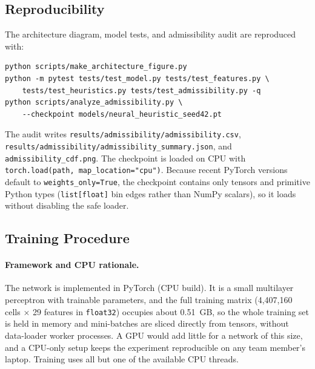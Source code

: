 \documentclass[11pt]{article}
\begin{document}
\subsection{Reproducibility}
The architecture diagram, model tests, and admissibility audit are reproduced
with:
\begin{verbatim}
python scripts/make_architecture_figure.py
python -m pytest tests/test_model.py tests/test_features.py \
    tests/test_heuristics.py tests/test_admissibility.py -q
python scripts/analyze_admissibility.py \
    --checkpoint models/neural_heuristic_seed42.pt
\end{verbatim}
The audit writes \texttt{results/admissibility/admissibility.csv},
\texttt{results/admissibility/admissibility\_summary.json}, and
\texttt{admissibility\_cdf.png}. The checkpoint is loaded on CPU with
\texttt{torch.load(path, map\_location="cpu")}. Because recent PyTorch versions
default to \texttt{weights\_only=True}, the checkpoint contains only tensors and
primitive Python types (\texttt{list[float]} bin edges rather than NumPy
scalars), so it loads without disabling the safe loader.

%


\subsection{Training Procedure}
\label{sec:phase3_training}

\trProvisional

\paragraph{Framework and CPU rationale.}
The network is implemented in PyTorch (CPU build). It is a small multilayer perceptron
with \trParams{} trainable parameters, and the full training matrix (4{,}407{,}160 cells
$\times$ 29 features in \texttt{float32}) occupies about 0.51~GB, so the whole training set
is held in memory and mini-batches are sliced directly from tensors, without data-loader
worker processes. A GPU would add little for a network of this size, and a CPU-only setup
keeps the experiment reproducible on any team member's laptop. Training uses all but one of
the available CPU threads.
\end{document}
